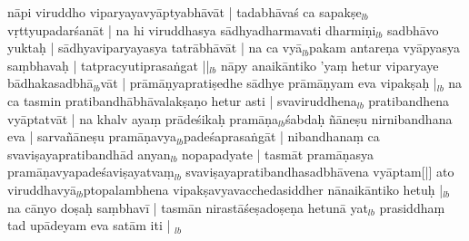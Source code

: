 \documentclass[article,12pt,a4paper]{memoir}%
\newcounter{parCount}
\begin{document}
	  
	  \pstart \leavevmode%
	nāpi viruddho viparyayavyāptyabhāvāt | tadabhāvaś ca sapakṣe{\tiny $_{lb}$} vṛttyupadarśanāt | na hi viruddhasya sādhyadharmavati dharmiṇi{\tiny $_{lb}$} sadbhāvo yuktaḥ | sādhyaviparyayasya tatrābhāvāt | na ca vyā{\tiny $_{lb}$}pakam antareṇa vyāpyasya saṃbhavaḥ | tatpracyutiprasaṅgat ||{\tiny $_{lb}$} \leavevmode{} nāpy anaikāntiko 'yaṃ hetur viparyaye bādhakasadbhā{\tiny $_{lb}$}vāt | prāmāṇyapratiṣedhe sādhye prāmāṇyam eva vipakṣaḥ |{\tiny $_{lb}$} na ca tasmin pratibandhābhāvalakṣaṇo hetur asti | svaviruddhena{\tiny $_{lb}$} pratibandhena vyāptatvāt | na khalv ayaṃ prādeśikaḥ pramāṇa{\tiny $_{lb}$}śabdaḥ ñāneṣu nirnibandhana eva | sarvañāneṣu pramāṇavya{\tiny $_{lb}$}padeśaprasaṅgāt | nibandhanaṃ ca svaviṣayapratibandhād anyan{\tiny $_{lb}$} nopapadyate | tasmāt pramāṇasya pramāṇavyapadeśaviṣayatvaṃ{\tiny $_{lb}$} svaviṣayapratibandhasadbhāvena vyāptam[|] ato viruddhavyā{\tiny $_{lb}$}ptopalambhena vipakṣavyavacchedasiddher nānaikāntiko hetuḥ |{\tiny $_{lb}$} na cānyo doṣaḥ saṃbhavī | tasmān nirastāśeṣadoṣeṇa hetunā yat{\tiny $_{lb}$} prasiddhaṃ tad upādeyam eva satām iti |
	{}
	\pend%
      {\tiny $_{lb}$}
		
\end{document}
